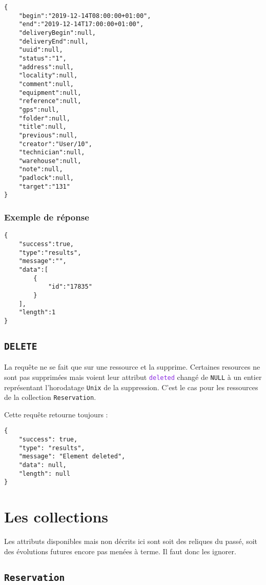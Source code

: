 \documentclass[a4paper,twoside]{article}
\newcommand{\verbe}[1]{\texttt{\textbf{#1}}}
\newcommand{\collection}[1]{\colorbox{light-gray}{\texttt{#1}}}
\newcommand{\attribut}[1]{\textcolor{BlueViolet}{\texttt{#1}}}
\begin{document}
\begin{verbatim}
{
	"begin":"2019-12-14T08:00:00+01:00",
	"end":"2019-12-14T17:00:00+01:00",
	"deliveryBegin":null,
	"deliveryEnd":null,
	"uuid":null,
	"status":"1",
	"address":null,
	"locality":null,
	"comment":null,
	"equipment":null,
	"reference":null,
	"gps":null,
	"folder":null,
	"title":null,
	"previous":null,
	"creator":"User/10",
	"technician":null,
	"warehouse":null,
	"note":null,
	"padlock":null,
	"target":"131"
}
\end{verbatim}


\subsubsection{Exemple de réponse}


\begin{verbatim}
{
	"success":true,
	"type":"results",
	"message":"",
	"data":[
		{
			"id":"17835"
		}
	],
	"length":1
}
\end{verbatim}


\subsection{\verbe{DELETE}}

La requête ne se fait que sur une ressource et la supprime. Certaines resources ne sont pas supprimées mais voient leur attribut \attribut{deleted} changé de \texttt{NULL} à un entier représentant l'horodatage \texttt{Unix} de la suppression. C'est le cas pour les ressources de la collection \collection{Reservation}.

Cette requête retourne toujours :

\begin{verbatim}
{
	"success": true,
	"type": "results",
	"message": "Element deleted",
	"data": null,
	"length": null
}
\end{verbatim}

\section{Les collections}

Les attributs disponibles mais non décrits ici sont soit des reliques du passé, soit des évolutions futures encore pas menées à terme. Il faut donc les ignorer.

\subsection{\collection{Reservation}}
\end{document}
